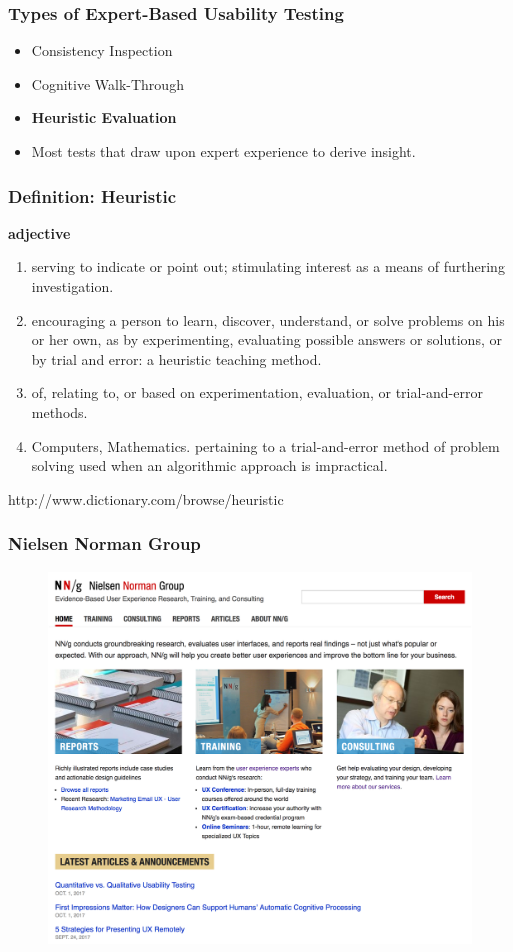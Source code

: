 \begin{frame}
	\frametitle{Types of Expert-Based Usability Testing}
		
	\begin{itemize}
		\item Consistency Inspection
		\item Cognitive Walk-Through
		\item \textbf{Heuristic Evaluation}
		\item Most tests that draw upon expert experience to derive insight.
	\end{itemize}
		
\end{frame}


\begin{frame}
	\frametitle{Definition: Heuristic}
		
	\textbf{adjective}
	\begin{enumerate}
		\item serving to indicate or point out; stimulating interest as a means of furthering investigation.
		\item encouraging a person to learn, discover, understand, or solve problems on his or her own, as by experimenting, evaluating possible answers or solutions, or by trial and error:
a heuristic teaching method.
		\item of, relating to, or based on experimentation, evaluation, or trial-and-error methods.
		\item Computers, Mathematics. pertaining to a trial-and-error method of problem solving used when an algorithmic approach is impractical.
	\end{enumerate}
	
	\tiny{http://www.dictionary.com/browse/heuristic}
\end{frame}


\begin{frame}
	\frametitle{Nielsen Norman Group}
	\begin{figure}
		\href{https://www.nngroup.com/}{\includegraphics[scale=.2]{assets/nngroup}}
	\end{figure}
\end{frame}


